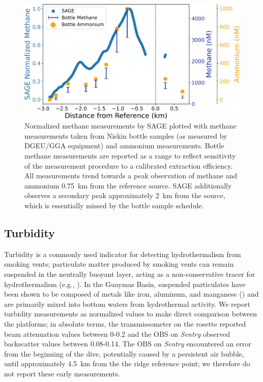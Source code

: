 \begin{figure}[h!]
    \centering
    \includegraphics[width=\columnwidth]{figures/chap3_bottle_norm.jpg}
    \caption{Normalized methane measurements by SAGE plotted with methane measurements taken from Niskin bottle samples (as measured by DGEU/GGA equipment) and ammonium measurements. Bottle methane measurements are reported as a range to reflect sensitivity of the measurement procedure to a calibrated extraction efficiency. All measurements trend towards a peak observation of methane and ammonium \SI{0.75}{\kilo\meter} from the reference source. SAGE additionally observes a secondary peak approximately \SI{2}{\kilo\meter} from the source, which is essentially missed by the bottle sample schedule.}
    \label{fig:bottles}
\end{figure}


\subsection{Turbidity}
\label{sec:turbidity_results}
Turbidity is a commonly used indicator for detecting hydrothermalism from smoking vents; particulate matter produced by smoking vents can remain suspended in the neutrally buoyant layer, acting as a non-conservative tracer for hydrothermalism (e.g., \cite{feely1992tracking}). In the Guaymas Basin, suspended particulates have been shown to be composed of metals like iron, aluminum, and manganese (\cite{scholz2019shelf}) and are primarily mixed into bottom waters from hydrothermal activity. We report turbidity measurements as normalized values to make direct comparison between the platforms; in absolute terms, the transmissometer on the rosette reported beam attenuation values between 0-0.2 and the OBS on \emph{Sentry} observed backscatter values between 0.08-0.14. The OBS on \emph{Sentry} encountered an error from the beginning of the dive, potentially caused by a persistent air bubble, until approximately \SI{4.5}{\kilo\meter} from the the ridge reference point; we therefore do not report these early measurements. 

